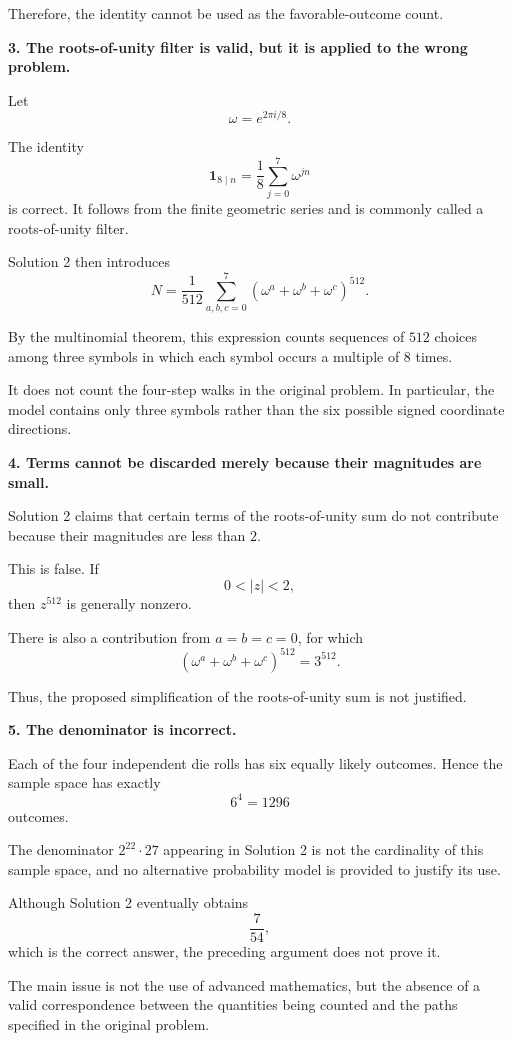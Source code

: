 \begin{enumerate}
 Therefore, the identity cannot be used as the favorable-outcome count.

 \textbf{3. The roots-of-unity filter is valid, but it is applied to the wrong problem.}

 Let
 \[\omega=e^{2\pi i/8}.\]

 The identity
 \[\mathbf1_{8\mid n}=\frac18\sum_{j=0}^7\omega^{jn}\]is correct. It follows from the finite geometric series and is commonly called a roots-of-unity filter.

 Solution 2 then introduces
 \[N=\frac1{512}\sum_{a,b,c=0}^7 (\omega^a+\omega^b+\omega^c)^{512}.\]

 By the multinomial theorem, this expression counts sequences of $512$ choices among three symbols in which each symbol occurs a multiple of $8$ times.

 It does not count the four-step walks in the original problem. In particular, the model contains only three symbols rather than the six possible signed coordinate directions.

 \textbf{4. Terms cannot be discarded merely because their magnitudes are small.}

 Solution 2 claims that certain terms of the roots-of-unity sum do not contribute because their magnitudes are less than $2$.

 This is false. If
 \[0<|z|<2,\]then $z^{512}$ is generally nonzero.

 There is also a contribution from $a=b=c=0$, for which
 \[(\omega^a+\omega^b+\omega^c)^{512}=3^{512}.\]

 Thus, the proposed simplification of the roots-of-unity sum is not justified.

 \textbf{5. The denominator is incorrect.}

 Each of the four independent die rolls has six equally likely outcomes. Hence the sample space has exactly
 \[6^4=1296\]outcomes.

 The denominator $2^{22}\cdot27$ appearing in Solution 2 is not the cardinality of this sample space, and no alternative probability model is provided to justify its use.

 Although Solution 2 eventually obtains
 \[\frac7{54},\]which is the correct answer, the preceding argument does not prove it.

 The main issue is not the use of advanced mathematics, but the absence of a valid correspondence between the quantities being counted and the paths specified in the original problem.


\end{enumerate}
